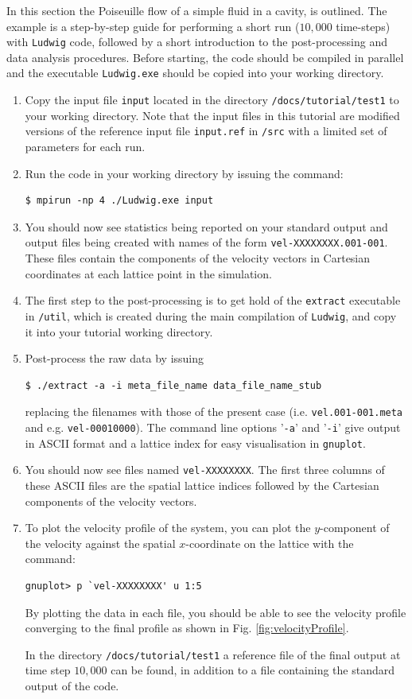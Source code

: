 \documentclass[11pt,twoside,a4paper]{article}
\begin{document}
In this section the Poiseuille flow of a simple fluid in a cavity, is outlined. 
The example is a step-by-step guide for performing a short run ($10,000$ time-steps) 
with \texttt{Ludwig} code, followed by a short introduction to the post-processing 
and data analysis procedures. Before starting, the code should be compiled in 
parallel and the executable \texttt{Ludwig.exe} should be copied into your working directory.
\begin{enumerate}
\item Copy the input file \texttt{input} located in the directory \texttt{/docs/tutorial/test1} 
to your working directory. Note that the input files in this tutorial are modified versions of the 
reference input file \texttt{input.ref} in \texttt{/src} with a limited set of parameters
for each run.
\item Run the code in your working directory by issuing the command:
\begin{lstlisting}
$ mpirun -np 4 ./Ludwig.exe input
\end{lstlisting}
\item You should now see statistics being reported on your standard output and 
output files being created with names of the form \texttt{vel-XXXXXXXX.001-001}. 
These files contain the components of the velocity vectors in Cartesian coordinates at each lattice point in the simulation. 
\item The first step to the post-processing is to get hold of the \texttt{extract} executable in \texttt{/util},
which is created during the main compilation of \texttt{Ludwig}, and copy it into your tutorial working directory. 
\item Post-process the raw data by issuing 
\begin{lstlisting}
$ ./extract -a -i meta_file_name data_file_name_stub
\end{lstlisting} 
replacing the filenames with those of the present case (i.e. \texttt{vel.001-001.meta} and e.g. \texttt{vel-00010000}).
The command line options '\texttt{-a}' and '\texttt{-i}' give output in ASCII format and a lattice index 
for easy visualisation in \texttt{gnuplot}.
\item You should now see files named \texttt{vel-XXXXXXXX}. The first three columns of these ASCII files are the spatial lattice indices followed by the Cartesian components of the velocity vectors.
\item To plot the velocity profile of the system, you can plot the $y$-component of the velocity against 
the spatial $x$-coordinate on the lattice with the command:
\begin{lstlisting}
gnuplot> p `vel-XXXXXXXX' u 1:5
\end{lstlisting} 
By plotting the data in each file, you should be able to see the velocity profile converging to the final profile as shown in Fig. \ref{fig:velocityProfile}. 

In the directory \texttt{/docs/tutorial/test1} a reference file of the final 
output at time step $10,000$ can be found, in addition to a file containing the standard output of the code.
\end{enumerate} 
\end{document}
